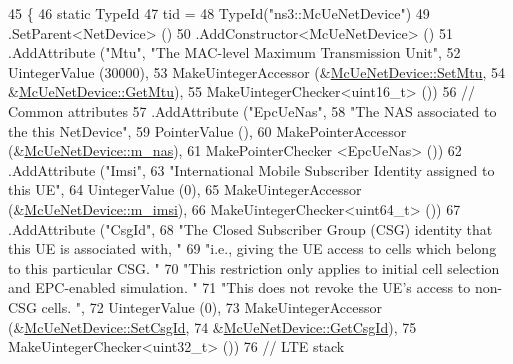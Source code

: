 \begin{DoxyCode}
45 \{
46         \textcolor{keyword}{static} TypeId
47         tid =
48         TypeId(\textcolor{stringliteral}{"ns3::McUeNetDevice"})
49         .SetParent<NetDevice> ()
50   .AddConstructor<McUeNetDevice> ()
51         .AddAttribute (\textcolor{stringliteral}{"Mtu"}, \textcolor{stringliteral}{"The MAC-level Maximum Transmission Unit"},
52                    UintegerValue (30000),
53                    MakeUintegerAccessor (&\hyperlink{classns3_1_1McUeNetDevice_a5e96ae8adedd8cbcfa150c00fb2f66cd}{McUeNetDevice::SetMtu},
54                                          &\hyperlink{classns3_1_1McUeNetDevice_a1187ad68b3cf7238e34d068e23c941ce}{McUeNetDevice::GetMtu}),
55                    MakeUintegerChecker<uint16\_t> ())
56         \textcolor{comment}{// Common attributes}
57         .AddAttribute (\textcolor{stringliteral}{"EpcUeNas"},
58                    \textcolor{stringliteral}{"The NAS associated to the this NetDevice"},
59                    PointerValue (),
60                    MakePointerAccessor (&\hyperlink{classns3_1_1McUeNetDevice_ad28cd170780f825a1d8b12beb814a511}{McUeNetDevice::m\_nas}),
61                    MakePointerChecker <EpcUeNas> ())
62   .AddAttribute (\textcolor{stringliteral}{"Imsi"},
63                    \textcolor{stringliteral}{"International Mobile Subscriber Identity assigned to this UE"},
64                    UintegerValue (0),
65                    MakeUintegerAccessor (&\hyperlink{classns3_1_1McUeNetDevice_ac441060b78843a6a01ddb10d68b1eee3}{McUeNetDevice::m\_imsi}),
66                    MakeUintegerChecker<uint64\_t> ())
67    .AddAttribute (\textcolor{stringliteral}{"CsgId"},
68                    \textcolor{stringliteral}{"The Closed Subscriber Group (CSG) identity that this UE is associated with, "}
69                    \textcolor{stringliteral}{"i.e., giving the UE access to cells which belong to this particular CSG. "}
70                    \textcolor{stringliteral}{"This restriction only applies to initial cell selection and EPC-enabled simulation. "}
71                    \textcolor{stringliteral}{"This does not revoke the UE's access to non-CSG cells. "},
72                    UintegerValue (0),
73                    MakeUintegerAccessor (&\hyperlink{classns3_1_1McUeNetDevice_a33217f5cc765e2ddb3c5689115b165b2}{McUeNetDevice::SetCsgId},
74                                          &\hyperlink{classns3_1_1McUeNetDevice_a064ec192432596ca55148753d8b458c5}{McUeNetDevice::GetCsgId}),
75                    MakeUintegerChecker<uint32\_t> ())
76     \textcolor{comment}{// LTE stack}

\end{DoxyCode}
